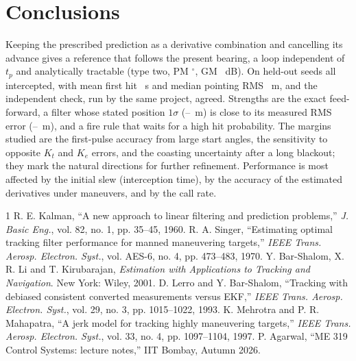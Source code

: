 \documentclass[conference]{IEEEtran}
\begin{document}
\section{Conclusions}
Keeping the prescribed prediction as a derivative combination and cancelling its advance gives a reference that follows the present bearing, a loop independent of $t_p$ and analytically tractable (type two, PM \DesPM$^\circ$, GM \DesGM~dB). On \HeldN{} held-out seeds all intercepted, with mean first hit \HeldFirstMean~s and median pointing RMS \HeldRmsMed~m, and the independent check, run by the same project, agreed. Strengths are the exact feed-forward, a filter whose stated position $1\sigma$ (\EstSigA--\EstSigB~m) is close to its measured RMS error (\EstNowRmsA--\EstNowRmsB~m), and a fire rule that waits for a high hit probability. The margins studied are the first-pulse accuracy from large start angles, the sensitivity to opposite $K_t$ and $K_e$ errors, and the coasting uncertainty after a long blackout; they mark the natural directions for further refinement. Performance is most affected by the initial slew (interception time), by the accuracy of the estimated derivatives under maneuvers, and by the call rate.

\begin{thebibliography}{1}
 R. E. Kalman, ``A new approach to linear filtering and prediction problems,'' \emph{J. Basic Eng.}, vol. 82, no. 1, pp. 35--45, 1960.
 R. A. Singer, ``Estimating optimal tracking filter performance for manned maneuvering targets,'' \emph{IEEE Trans. Aerosp. Electron. Syst.}, vol. AES-6, no. 4, pp. 473--483, 1970.
 Y. Bar-Shalom, X. R. Li and T. Kirubarajan, \emph{Estimation with Applications to Tracking and Navigation}. New York: Wiley, 2001.
 D. Lerro and Y. Bar-Shalom, ``Tracking with debiased consistent converted measurements versus EKF,'' \emph{IEEE Trans. Aerosp. Electron. Syst.}, vol. 29, no. 3, pp. 1015--1022, 1993.
 K. Mehrotra and P. R. Mahapatra, ``A jerk model for tracking highly maneuvering targets,'' \emph{IEEE Trans. Aerosp. Electron. Syst.}, vol. 33, no. 4, pp. 1097--1104, 1997.
 P. Agarwal, ``ME 319 Control Systems: lecture notes,'' IIT Bombay, Autumn 2026.
\end{thebibliography}
\end{document}
